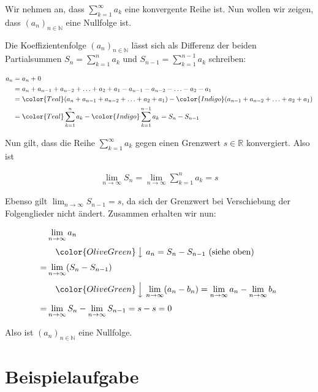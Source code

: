 \documentclass[fontsize=9pt,
               parskip=half-,
               DIV=14,
               listof=chapterentry,
               tocflat]{scrbook}
\begin{document}
\begin{proof*}
Wir nehmen an, dass $\sum _{k=1}^{\infty }a_{k}$ eine konvergente Reihe ist. Nun wollen wir zeigen, dass $(a_{n})_{n\in \mathbb {N} }$ eine Nullfolge ist.

Die Koeffizientenfolge $(a_{n})_{n\in \mathbb {N} }$ lässt sich als Differenz der beiden Partialsummen $S_{n}=\sum _{k=1}^{n}a_{k}$ und $S_{n-1}=\sum _{k=1}^{n-1}a_{k}$ schreiben:

\begin{align*}
a_{n}&=a_{n}+0\\&=a_{n}+a_{n-1}+a_{n-2}+\ldots +a_{2}+a_{1}-a_{n-1}-a_{n-2}-\ldots -a_{2}-a_{1}\\&={\color {Teal}(a_{n}+a_{n-1}+a_{n-2}+\ldots +a_{2}+a_{1})}-{\color {Indigo}(a_{n-1}+a_{n-2}+\ldots +a_{2}+a_{1})}\\&={\color {Teal}\sum _{k=1}^{n}a_{k}}-{\color {Indigo}\sum _{k=1}^{n-1}a_{k}}=S_{n}-S_{n-1}
\end{align*}

Nun gilt, dass die Reihe $\sum _{k=1}^{\infty }a_{k}$ gegen einen Grenzwert $s\in \mathbb {R} $ konvergiert. Also ist

\begin{align*}
\lim _{n\to \infty }S_{n}=\lim _{n\to \infty }\sum _{k=1}^{n}a_{k}=s
\end{align*}

Ebenso gilt $\lim _{n\to \infty }S_{n-1}=s$, da sich der Grenzwert bei Verschiebung der Folgenglieder nicht ändert. Zusammen erhalten wir nun:

\begin{align*}
&\lim _{n\to \infty }a_{n}\\[0.3em]&\quad {\color {OliveGreen}\left\downarrow \ a_{n}=S_{n}-S_{n-1}{\text{ (siehe oben)}}\right.}\\[0.3em]=&\lim _{n\to \infty }(S_{n}-S_{n-1})\\[0.3em]&\quad {\color {OliveGreen}\left\downarrow \ \lim _{n\to \infty }(a_{n}-b_{n})=\lim _{n\to \infty }a_{n}-\lim _{n\to \infty }b_{n}\right.}\\[0.3em]=&\lim _{n\to \infty }S_{n}-\lim _{n\to \infty }S_{n-1}=s-s=0
\end{align*}

Also ist $(a_{n})_{n\in \mathbb {N} }$ eine Nullfolge.

\end{proof*}

\section{Beispielaufgabe}
\end{document}
